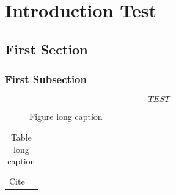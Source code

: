 \chapter{Introduction Test}

\section{First Section}
\subsection{First Subsection}


\begin{figure}[h]
    \centering
    \begin{equation*}
        TEST
    \end{equation*}
    \caption[Figure short caption]{Figure long caption}
\end{figure}

\begin{table}[h]
    \centering
    \begin{tabular}{c|c}
      Cite   & \cite{dirac}  \\
    \end{tabular}
    \caption[Table short caption]{Table long caption}
\end{table}

\lipsum
